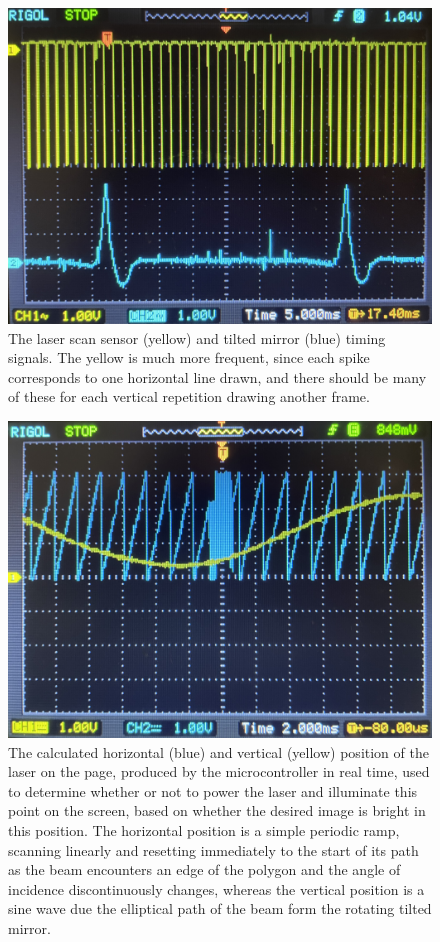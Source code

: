 \documentclass[twocolumn]{revtex4-2}
\begin{document}
\begin{figure}
    \centering
    \includegraphics[width=0.95\linewidth]{dual-spike-signals.jpeg}
    \caption[Both Timing Signals]{The laser scan sensor (yellow) and tilted mirror (blue) timing signals. The yellow is much more frequent, since each spike corresponds to one horizontal line drawn, and there should be many of these for each vertical repetition drawing another frame. }
    \label{fig:dual-spike-signals}
\end{figure}


\begin{figure}
    \centering
    \includegraphics[width=0.95\linewidth]{position-calculated.jpeg}
    \caption[Calculated Beam Position Signal]{The calculated horizontal (blue) and vertical (yellow) position of the laser on the page, produced by the microcontroller in real time, used to determine whether or not to power the laser and illuminate this point on the screen, based on whether the desired image is bright in this position. The horizontal position is a simple periodic ramp, scanning linearly and resetting immediately to the start of its path as the beam encounters an edge of the polygon and the angle of incidence discontinuously changes, whereas the vertical position is a sine wave due the elliptical path of the beam form the rotating tilted mirror.}
    \label{fig:position-calculation-saw-sine}
\end{figure}
\end{document}
